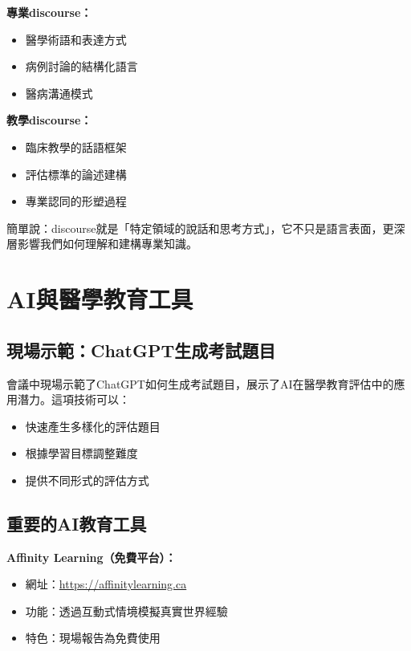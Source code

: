 \documentclass[12pt,a4paper]{article}
\newcommand{\note}[1]{
    \par
    \noindent
    \begin{tcolorbox}[
        colback=emergency_blue!5!white,
        colframe=emergency_blue,
        title=\textbf{重點提醒},
        fonttitle=\bfseries,
        boxrule=0.5pt,
        arc=3pt,
        left=6pt,
        right=6pt,
        top=6pt,
        bottom=6pt
    ]
    #1
    \end{tcolorbox}
}
\begin{document}
\textbf{專業discourse：}
\begin{itemize}[nosep]
    \item 醫學術語和表達方式
    \item 病例討論的結構化語言
    \item 醫病溝通模式
\end{itemize}

\textbf{教學discourse：}
\begin{itemize}[nosep]
    \item 臨床教學的話語框架
    \item 評估標準的論述建構
    \item 專業認同的形塑過程
\end{itemize}

\vspace{0.5cm}
\note{
簡單說：discourse就是「特定領域的說話和思考方式」，它不只是語言表面，更深層影響我們如何理解和建構專業知識。
}

\section{AI與醫學教育工具}

\subsection{現場示範：ChatGPT生成考試題目}

會議中現場示範了ChatGPT如何生成考試題目，展示了AI在醫學教育評估中的應用潛力。這項技術可以：
\begin{itemize}[nosep]
    \item 快速產生多樣化的評估題目
    \item 根據學習目標調整難度
    \item 提供不同形式的評估方式
\end{itemize}

\subsection{重要的AI教育工具}

\textbf{Affinity Learning（免費平台）：}
\begin{itemize}[nosep]
    \item 網址：\url{https://affinitylearning.ca}
    \item 功能：透過互動式情境模擬真實世界經驗
    \item 特色：現場報告為免費使用
\end{itemize}
\end{document}
